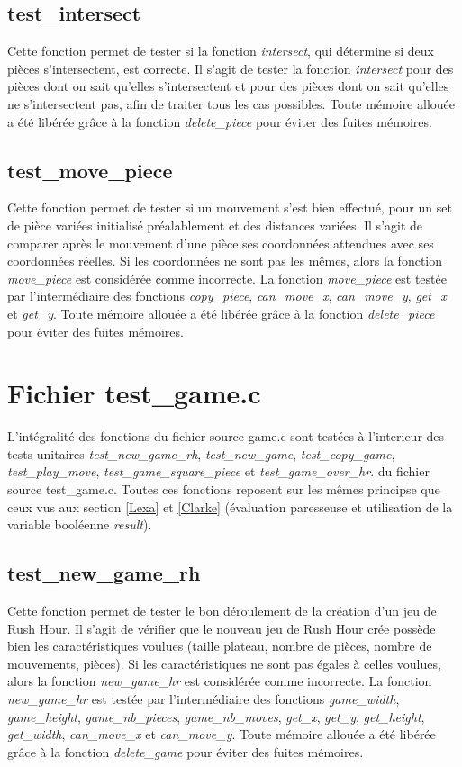 \documentclass{report}
\begin{document}
\subsection{test\_intersect}
Cette fonction permet de tester si la fonction \emph{intersect}, qui détermine si deux pièces s'intersectent, est correcte. Il s'agit de tester la fonction \emph{intersect} pour des pièces dont on sait qu'elles s'intersectent et pour des pièces dont on sait qu'elles ne s'intersectent pas, afin de traiter tous les cas possibles. Toute mémoire allouée a été libérée grâce à la fonction \emph{delete\_piece} pour éviter des fuites mémoires.
\subsection{test\_move\_piece}
Cette fonction permet de tester si un mouvement s'est bien effectué, pour un set de pièce variées initialisé préalablement et des distances variées. Il s'agit de comparer après le mouvement d'une pièce ses coordonnées attendues avec ses coordonnées réelles. Si les coordonnées ne sont pas les mêmes, alors la fonction \emph{move\_piece} est considérée comme incorrecte. La fonction \emph{move\_piece} est testée par l'intermédiaire des fonctions \emph{copy\_piece}, \emph{can\_move\_x}, \emph{can\_move\_y}, \emph{get\_x} et \emph{get\_y}. Toute mémoire allouée a été libérée grâce à la fonction \emph{delete\_piece} pour éviter des fuites mémoires.

\section{Fichier test\_game.c}
L'intégralité des fonctions du fichier source game.c sont testées à l'interieur des tests unitaires \emph{test\_new\_game\_rh}, \emph{test\_new\_game}, \emph{test\_copy\_game}, \emph{test\_play\_move}, \emph{test\_game\_square\_piece} et \emph{test\_game\_over\_hr}. du fichier source test\_game.c. Toutes ces fonctions reposent sur les mêmes principse que ceux vus aux section \ref{Lexa} et \ref{Clarke} (évaluation paresseuse et utilisation de la variable booléenne \emph{result}).
\subsection{test\_new\_game\_rh}
Cette fonction permet de tester le bon déroulement de la création d'un jeu de Rush Hour. Il s'agit de vérifier que le nouveau jeu de Rush Hour crée possède bien les caractéristiques voulues (taille plateau, nombre de pièces, nombre de mouvements, pièces). Si les caractéristiques ne sont pas égales à celles voulues, alors la fonction \emph{new\_game\_hr} est considérée comme incorrecte. La fonction \emph{new\_game\_hr} est testée par l'intermédiaire des fonctions \emph{game\_width}, \emph{game\_height}, \emph{game\_nb\_pieces}, \emph{game\_nb\_moves}, \emph{get\_x}, \emph{get\_y}, \emph{get\_height}, \emph{get\_width}, \emph{can\_move\_x} et \emph{can\_move\_y}. Toute mémoire allouée a été libérée grâce à la fonction \emph{delete\_game} pour éviter des fuites mémoires.
\end{document}
